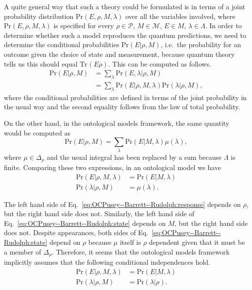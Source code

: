 \documentclass[DIV=calc,fontsize=12pt]{scrartcl} %
\theoremstyle{definition}
\theoremstyle{plain}
\newcommand{\Tr}[2][]{\ensuremath{\text{Tr}_{#1} \left ( #2 \right )}}
\begin{document}
A quite general way that such a theory could be formulated is in terms
of a joint probability distribution $\text{Pr}(E,\rho,M,\lambda)$ over
all the variables involved, where $\text{Pr}(E,\rho,M,\lambda)$ is
specified for every $\rho \in \mathcal{P}$, $M \in \mathcal{M}$, $E
\in M$, $\lambda \in \Lambda$.  In order to determine whether such a
model reproduces the quantum predictions, we need to determine the
conditional probabilities $\text{Pr}(E|\rho,M)$, i.e.\ the probability
for an outcome given the choice of state and measurement, because
quantum theory tells us this should equal $\Tr{E\rho}$.  This can be
computed as follows.
\begin{align}
\text{Pr}(E|\rho, M) &= \sum_{\lambda} \text{Pr}(E,\lambda| \rho,
M)\nonumber\\
&= \sum_{\lambda} \text{Pr}(E|\rho,M,\lambda)
\text{Pr}(\lambda|\rho,M),
\end{align}
where the conditional probabilities are defined in terms of the joint
probability in the usual way and the second equality follows from the
law of total probability.

On the other hand, in the ontological models framework, the same
quantity would be computed as
\begin{equation}
\text{Pr}(E|\rho,M) = \sum_{\lambda} \text{Pr}(E|M,\lambda)
\mu(\lambda),
\end{equation}
where $\mu \in \Delta_\rho$ and the usual integral has been replaced
by a sum because $\Lambda$ is finite.  Comparing these two
expressions, in an ontological model we have
\begin{align}
\text{Pr}(E|\rho,M,\lambda) & =
\text{Pr}(E|M,\lambda) \label{eq:OCPusey--Barrett--Rudolph:response} \\
\text{Pr}(\lambda|\rho,M) & = \mu(\lambda). \label{eq:OCPusey--Barrett--Rudolph:state}
\end{align}

The left hand side of Eq.~\eqref{eq:OCPusey--Barrett--Rudolph:response} depends on $\rho$,
but the right hand side does not.  Similarly, the left hand side of
Eq.~\eqref{eq:OCPusey--Barrett--Rudolph:state} depends on $M$, but the right hand side
does not.  Despite appearances, both sides of
Eq.~\eqref{eq:OCPusey--Barrett--Rudolph:state} depend on $\rho$ because $\mu$ itself is
$\rho$ dependent given that it must be a member of $\Delta_{\rho}$.
Therefore, it seems that the ontological models framework implicitly
assumes that the following conditional independences hold.
\begin{align}
\text{Pr}(E|\rho,M,\lambda) & = \text{Pr}(E|M,\lambda) \\
\text{Pr}(\lambda|\rho,M) & = \text{Pr}(\lambda|\rho).
\end{align}
\end{document}
